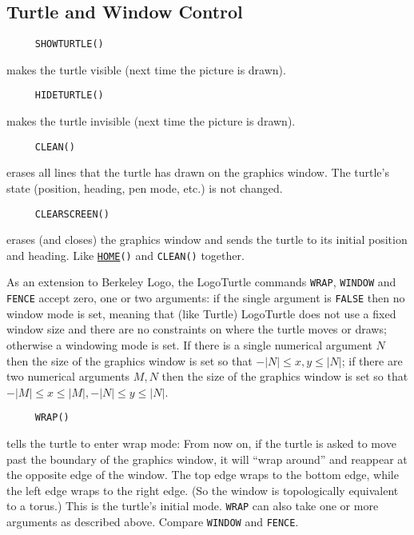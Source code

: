 

\subsection{Turtle and Window Control}
\label{logoturtle:TWC}

\begin{verbatim}
     SHOWTURTLE()
\end{verbatim}
\label{logoturtle:showturtle}
makes the turtle visible (next time the picture is drawn).

\begin{verbatim}
     HIDETURTLE()
\end{verbatim}
\label{logoturtle:hideturtle}
makes the turtle invisible (next time the picture is drawn).

\begin{verbatim}
     CLEAN()
\end{verbatim}
erases all lines that the turtle has drawn on the graphics window.
The turtle's state (position, heading, pen mode, etc.) is not changed.

\begin{verbatim}
     CLEARSCREEN()
\end{verbatim}
erases (and closes) the graphics window and sends the turtle to its
initial position and heading.  Like
\texttt{\hyperref[logoturtle:home]{HOME}()} and \texttt{CLEAN()}
together.

As an extension to Berkeley Logo, the LogoTurtle commands
\texttt{WRAP}, \texttt{WINDOW} and \texttt{FENCE} accept zero, one or
two arguments: if the single argument is \texttt{FALSE} then no window
mode is set, meaning that (like Turtle) LogoTurtle does not use a
fixed window size and there are no constraints on where the turtle
moves or draws; otherwise a windowing mode is set.  If there is a
single numerical argument $N$ then the size of the graphics window is
set so that $-|N| \le x,y \le |N|$; if there are two numerical
arguments $M, N$ then the size of the graphics window is set so that
$-|M| \le x \le |M|, -|N| \le y \le |N|$.

\begin{verbatim}
     WRAP()
\end{verbatim}
tells the turtle to enter wrap mode: From now on, if the turtle is
asked to move past the boundary of the graphics window, it will ``wrap
around'' and reappear at the opposite edge of the window.  The top
edge wraps to the bottom edge, while the left edge wraps to the right
edge.  (So the window is topologically equivalent to a torus.)  This
is the turtle's initial mode.  \texttt{WRAP} can also take one or more
arguments as described above.  Compare \texttt{WINDOW} and
\texttt{FENCE}.

